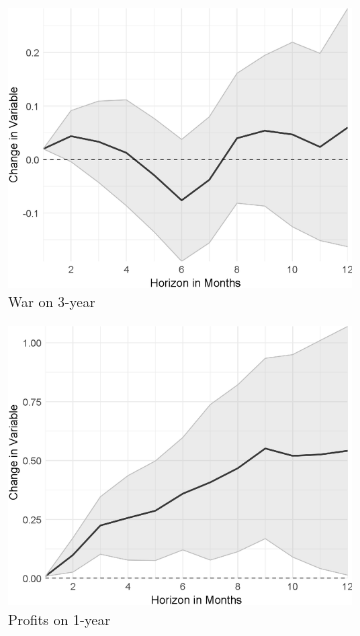 \begin{figure}[H]
\begin{subfigure}{00.32\textwidth}
	\includegraphics[width=1\textwidth]{output/lp/baseline/level/war/waronexpectations3y_djn.eps}
	\caption{War on 3-year}
\end{subfigure}
\begin{subfigure}{00.32\textwidth}
	\includegraphics[width=1\textwidth]{output/lp/baseline/level/profits/profitsonexpectations1y_djn.eps}
	\caption{Profits on 1-year}
\end{subfigure}
\begin{subfigure}{00.32\textwidth}

\end{subfigure}
\end{figure}
